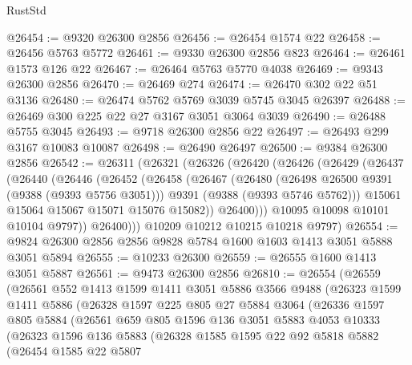 \begin{lexlean}{RustStd}
\begin{coremodule}
@26454 := @9320 @26300 @2856
@26456 := @26454 @1574 @22
@26458 := @26456 @5763 @5772
@26461 := @9330 @26300 @2856 @823
@26464 := @26461 @1573 @126 @22
@26467 := @26464 @5763 @5770 @4038
@26469 := @9343 @26300 @2856
@26470 := @26469 @274
@26474 := @26470 @302 @22 @51 @3136
@26480 := @26474 @5762 @5769 @3039 @5745 @3045 @26397
@26488 := @26469 @300 @225 @22 @27 @3167 @3051 @3064 @3039
@26490 := @26488 @5755 @3045
@26493 := @9718 @26300 @2856 @22
@26497 := @26493 @299 @3167 @10083 @10087
@26498 := @26490 @26497
@26500 := @9384 @26300 @2856
@26542 := @26311
    (@26321
      (@26326
        (@26420
          (@26426
            (@26429
              (@26437
                (@26440
                  (@26446
                    (@26452
                      (@26458
                        (@26467
                          (@26480
                            (@26498 @26500 @9391 (@9388 (@9393 @5756 @3051)))
                            @9391
                            (@9388 (@9393 @5746 @5762)))
                          @15061
                          @15064
                          @15067
                          @15071
                          @15076
                          @15082))
                      @26400)))
                @10095
                @10098
                @10101
                @10104
                @9797))
            @26400)))
      @10209
      @10212
      @10215
      @10218
      @9797)
@26554 := @9824 @26300 @2856 @2856 @9828 @5784 @1600 @1603 @1413 @3051 @5888 @3051 @5894
@26555 := @10233 @26300
@26559 := @26555 @1600 @1413 @3051 @5887
@26561 := @9473 @26300 @2856
@26810 := @26554
    (@26559
      (@26561
        @552
        @1413
        @1599
        @1411
        @3051
        @5886
        @3566
        @9488
        (@26323
          @1599
          @1411
          @5886
          (@26328
            @1597
            @225
            @805
            @27
            @5884
            @3064
            (@26336
              @1597
              @805
              @5884
              (@26561
                @659
                @805
                @1596
                @136
                @3051
                @5883
                @4053
                @10333
                (@26323
                  @1596
                  @136
                  @5883
                  (@26328
                    @1585
                    @1595
                    @22
                    @92
                    @5818
                    @5882
                    (@26454
                      @1585
                      @22
                      @5807

\end{coremodule}
\end{lexlean}
